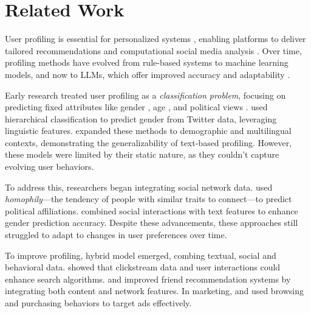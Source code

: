 \section{Related Work}

User profiling is essential for personalized systems \cite{shen2005implicit, yao2020employing, zhu2008impact}, enabling platforms to deliver tailored recommendations \cite{balog2019transparent, lu2015exploiting, middleton2004ontological} and computational social media analysis \cite{arunachalam2013new, bamman2014gender, tang2015learning, al2020comparative}. Over time, profiling methods have evolved from rule-based systems to machine learning models, and now to LLMs, which offer improved accuracy and adaptability \cite{bloedorn1998using, wu2024understanding}. 

Early research treated user profiling as a \textit{classification problem}, focusing on predicting fixed attributes like gender \cite{liu2012using, rao2010classifying, liu2013s, sakaki2014twitter, priadana2020gender}, age \cite{rosenthal2011age, sap2014developing, chen2015comparative, fang2015relational, mac2017demographic, bessarab2025social}, and political views \cite{rao2010classifying, demszky2019analyzing, hettiachchi2021us}. used hierarchical classification to predict gender from Twitter data, leveraging linguistic features. \cite{liu2013using, ciot2013gender} expanded these methods to demographic and multilingual contexts, demonstrating the generalizability of text-based profiling. However, these models were limited by their static nature, as they couldn’t capture evolving user behaviors.

To address this, researchers began integrating social network data. \citet{al2012homophily} used \textit{homophily}—the tendency of people with similar traits to connect—to predict political affiliations. \citet{onikoyi2023gender} combined social interactions with text features to enhance gender prediction accuracy. Despite these advancements, these approaches still struggled to adapt to changes in user preferences over time.

To improve profiling, hybrid model emerged, combing textual, social and behavioral data. \citet{agichtein2006improving} showed that clickstream data and user interactions could enhance search algorithms. \citet{agarwal2013collaborative} and \citet{priadana2020gender} improved friend recommendation systems by integrating both content and network features. In marketing, \citet{bucklin2003model} and \citet{shah2021marketing} used browsing and purchasing behaviors to target ads effectively.

